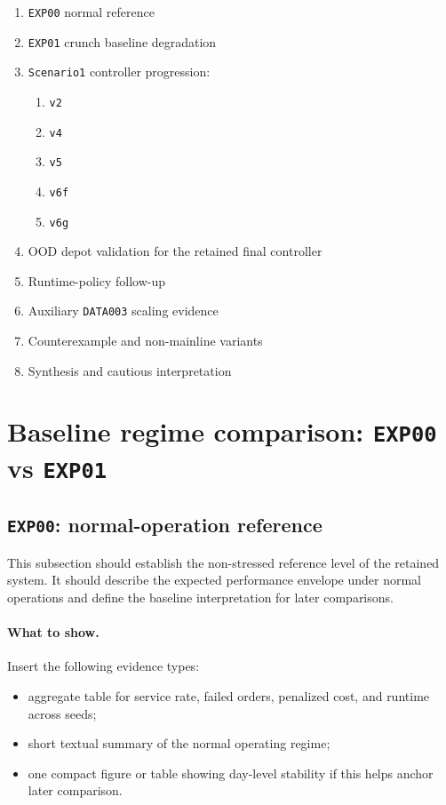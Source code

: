\begin{enumerate}
    \item \texttt{EXP00} normal reference
    \item \texttt{EXP01} crunch baseline degradation
    \item \texttt{Scenario1} controller progression:
    \begin{enumerate}
        \item \texttt{v2}
        \item \texttt{v4}
        \item \texttt{v5}
        \item \texttt{v6f}
        \item \texttt{v6g}
    \end{enumerate}
    \item OOD depot validation for the retained final controller
    \item Runtime-policy follow-up
    \item Auxiliary \texttt{DATA003} scaling evidence
    \item Counterexample and non-mainline variants
    \item Synthesis and cautious interpretation
\end{enumerate}

\section{Baseline regime comparison: \texttt{EXP00} vs \texttt{EXP01}}
\label{sec:results-baselines}

\subsection{\texttt{EXP00}: normal-operation reference}
\label{sec:results-exp00}

This subsection should establish the non-stressed reference level of the retained system.
It should describe the expected performance envelope under normal operations and define the baseline interpretation for later comparisons.

\paragraph{What to show.}
Insert the following evidence types:
\begin{itemize}
    \item aggregate table for service rate, failed orders, penalized cost, and runtime across seeds;
    \item short textual summary of the normal operating regime;
    \item one compact figure or table showing day-level stability if this helps anchor later comparison.
\end{itemize}


